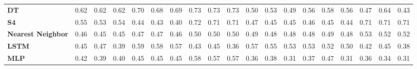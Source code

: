 \begin{table}[t]
{\begin{tabular}{l ccc ccc ccc ccc ccc ccc}
\textbf{DT} & \cellcolor[HTML]{A8D250}0.62 & \cellcolor[HTML]{A9D250}0.62 & \cellcolor[HTML]{A8D250}0.62 & \cellcolor[HTML]{77D05D}0.70 & \cellcolor[HTML]{82D05A}0.68 & \cellcolor[HTML]{7ED05B}0.69 & \cellcolor[HTML]{5FCF63}0.73 & \cellcolor[HTML]{5FCF63}0.73 & \cellcolor[HTML]{60CF62}0.73 & \cellcolor[HTML]{FFD33C}0.50 & \cellcolor[HTML]{E7D341}0.53 & \cellcolor[HTML]{FFD13D}0.49 & \cellcolor[HTML]{D8D345}0.56 & \cellcolor[HTML]{C4D24A}0.58 & \cellcolor[HTML]{D2D346}0.56 & \cellcolor[HTML]{FFC840}0.47 & \cellcolor[HTML]{9FD153}0.64 & \cellcolor[HTML]{FFB549}0.43 \\
\textbf{S4} & \cellcolor[HTML]{DBD344}0.55 & \cellcolor[HTML]{E7D341}0.53 & \cellcolor[HTML]{E3D342}0.54 & \cellcolor[HTML]{FFBC46}0.44 & \cellcolor[HTML]{FFB549}0.43 & \cellcolor[HTML]{FFAA4E}0.40 & \cellcolor[HTML]{68D060}0.72 & \cellcolor[HTML]{6BD060}0.71 & \cellcolor[HTML]{6BD060}0.71 & \cellcolor[HTML]{FFCA40}0.47 & \cellcolor[HTML]{FFBE45}0.45 & \cellcolor[HTML]{FFBE45}0.45 & \cellcolor[HTML]{FFC243}0.46 & \cellcolor[HTML]{FFBF45}0.45 & \cellcolor[HTML]{FFBB46}0.44 & \cellcolor[HTML]{6DD05F}0.71 & \cellcolor[HTML]{6BD060}0.71 & \cellcolor[HTML]{6CD05F}0.71 \\
\textbf{Nearest Neighbor} & \cellcolor[HTML]{FFC243}0.46 & \cellcolor[HTML]{FFBD45}0.45 & \cellcolor[HTML]{FFBE45}0.45 & \cellcolor[HTML]{FFC841}0.47 & \cellcolor[HTML]{FFC741}0.47 & \cellcolor[HTML]{FFC442}0.46 & \cellcolor[HTML]{FCD43C}0.50 & \cellcolor[HTML]{FFD33C}0.50 & \cellcolor[HTML]{FFD33B}0.50 & \cellcolor[HTML]{FFD13C}0.49 & \cellcolor[HTML]{FFCB3F}0.48 & \cellcolor[HTML]{FFCD3E}0.48 & \cellcolor[HTML]{FFCD3E}0.48 & \cellcolor[HTML]{FFCF3D}0.49 & \cellcolor[HTML]{FFCD3E}0.48 & \cellcolor[HTML]{EED43F}0.53 & \cellcolor[HTML]{EED43F}0.52 & \cellcolor[HTML]{EFD43F}0.52 \\
\textbf{LSTM} & \cellcolor[HTML]{FFC044}0.45 & \cellcolor[HTML]{FFC940}0.47 & \cellcolor[HTML]{FFA84F}0.39 & \cellcolor[HTML]{C3D24A}0.59 & \cellcolor[HTML]{C6D249}0.58 & \cellcolor[HTML]{CCD348}0.57 & \cellcolor[HTML]{FFB649}0.43 & \cellcolor[HTML]{FFC044}0.45 & \cellcolor[HTML]{FF9A55}0.36 & \cellcolor[HTML]{CED347}0.57 & \cellcolor[HTML]{DBD344}0.55 & \cellcolor[HTML]{EBD340}0.53 & \cellcolor[HTML]{E9D341}0.53 & \cellcolor[HTML]{F4D43E}0.52 & \cellcolor[HTML]{FFD33B}0.50 & \cellcolor[HTML]{FFB24B}0.42 & \cellcolor[HTML]{FFBF44}0.45 & \cellcolor[HTML]{FFA252}0.38 \\
\textbf{MLP} & \cellcolor[HTML]{FFB34A}0.42 & \cellcolor[HTML]{FFA74F}0.39 & \cellcolor[HTML]{FFAB4E}0.40 & \cellcolor[HTML]{FFBF45}0.45 & \cellcolor[HTML]{FFBE45}0.45 & \cellcolor[HTML]{FFBE45}0.45 & \cellcolor[HTML]{C9D248}0.58 & \cellcolor[HTML]{CED347}0.57 & \cellcolor[HTML]{CCD348}0.57 & \cellcolor[HTML]{FF9956}0.36 & \cellcolor[HTML]{FFA252}0.38 & \cellcolor[HTML]{FF865F}0.31 & \cellcolor[HTML]{FF9C55}0.37 & \cellcolor[HTML]{FFC841}0.47 & \cellcolor[HTML]{FF865F}0.31 & \cellcolor[HTML]{FF9A55}0.36 & \cellcolor[HTML]{FF8F5A}0.34 & \cellcolor[HTML]{FF855F}0.31 \\

\end{tabular}}
\end{table}
